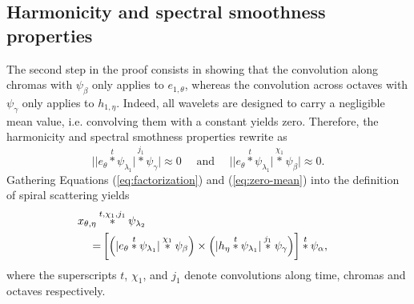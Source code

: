 \documentclass[twoside,a4paper]{article}
\begin{document}
\subsection{Harmonicity and spectral smoothness properties}

The second step in the proof consists in showing that the convolution along chromas with $\psi_\beta$ only applies to $e_{1,\theta}$, whereas the convolution across octaves with $\psi_\gamma$ only applies to $h_{1,\eta}$. Indeed, all wavelets are designed to carry a negligible mean value, i.e. convolving them with a constant yields zero. Therefore, the harmonicity and spectral smothness properties rewrite as
\begin{equation}
\Big\vert \vert e_\theta \overset{t}{\ast} \psi_{\lambda_1} \vert \overset{j_1}{\ast} \psi_{\gamma} \Big\vert \approx 0
\quad
\text{ and }
\quad
\Big\vert \vert e_\theta \overset{t}{\ast} \psi_{\lambda_1} \vert \overset{\chi_1}{\ast} \psi_{\beta} \Big \vert \approx 0.
\label{eq:zero-mean}
\end{equation}
Gathering Equations (\ref{eq:factorization}) and (\ref{eq:zero-mean}) into the definition of spiral scattering yields
\begin{eqnarray}
x_{\theta,\eta}\overset{t,\chi_{1},j_{1}}{\ast}\psi_{\lambda_{2}}  \mkern-72mu \\
 = & \left[\Big(\vert e_{\theta}\overset{t}{\ast}\psi_{\lambda_{1}}\vert\overset{\chi_{1}}{\ast}\psi_{\beta}\Big)\times \Big(\vert h_{\eta}\overset{t}{\ast}\psi_{\lambda_{1}}\vert\overset{j_{1}}{\ast}\psi_{\gamma}\Big)\right]\overset{t}{\ast}\psi_{\alpha} \nonumber,
\end{eqnarray}
where the superscripts $t$, $\chi_{1}$, and $j_{1}$ denote convolutions along time, chromas and octaves respectively.
\end{document}
